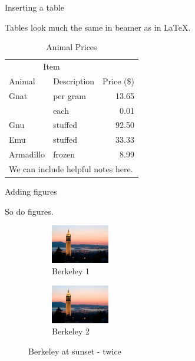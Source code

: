 \documentclass{beamer}
\begin{document}
\begin{frame}{Inserting a table}

Tables look much the same in beamer as in \LaTeX.

\begin{table}[h!]
	\centering
	\caption{Animal Prices}\label{tab:animal}
	\begin{tabular}{llr} \toprule
		\multicolumn{2}{c}{Item} \\ \cmidrule(r){1-2}
		Animal & Description & Price (\$)\\ \midrule
		Gnat & per gram & 13.65 \\
		& each & 0.01 \\
		Gnu & stuffed & 92.50 \\
		Emu & stuffed & 33.33 \\ \addlinespace
		Armadillo & frozen & 8.99 \\ \midrule
		\multicolumn{3}{l}{\footnotesize We can include helpful notes here.} \\
		\bottomrule
	\end{tabular}
\end{table}
\end{frame}

\begin{frame}{Adding figures}

So do figures.

\begin{figure}[h!]
	\centering
	\begin{subfigure}[t]{1in}
		\centering
		\caption{Berkeley 1}\label{fig:2a}
		\includegraphics[width=1in]{campanile.jpg}				
	\end{subfigure}
	\begin{subfigure}[t]{1in}
		\centering
		\caption{Berkeley 2}\label{fig:2b}
		\includegraphics[width=1in]{campanile.jpg}		
	\end{subfigure}
	\caption{Berkeley at sunset - twice}\label{fig:2}
\end{figure}
\end{frame}
\end{document}

